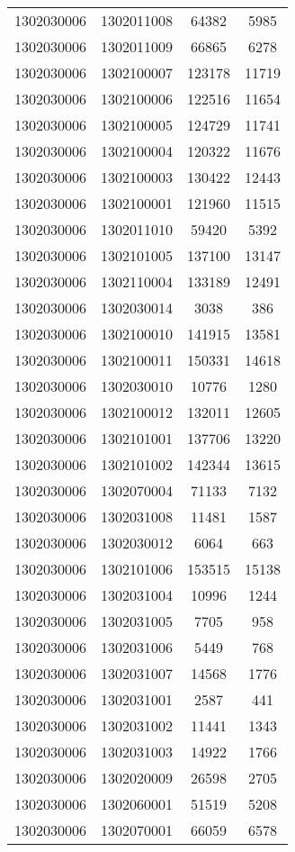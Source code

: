 \begin{longtable}[h]{llcc}
		1302030006 & 1302011008 & 64382 & 5985\\
		1302030006 & 1302011009 & 66865 & 6278\\
		1302030006 & 1302100007 & 123178 & 11719\\
		1302030006 & 1302100006 & 122516 & 11654\\
		1302030006 & 1302100005 & 124729 & 11741\\
		1302030006 & 1302100004 & 120322 & 11676\\
		1302030006 & 1302100003 & 130422 & 12443\\
		1302030006 & 1302100001 & 121960 & 11515\\
		1302030006 & 1302011010 & 59420 & 5392\\
		1302030006 & 1302101005 & 137100 & 13147\\
		1302030006 & 1302110004 & 133189 & 12491\\
		1302030006 & 1302030014 & 3038 & 386\\
		1302030006 & 1302100010 & 141915 & 13581\\
		1302030006 & 1302100011 & 150331 & 14618\\
		1302030006 & 1302030010 & 10776 & 1280\\
		1302030006 & 1302100012 & 132011 & 12605\\
		1302030006 & 1302101001 & 137706 & 13220\\
		1302030006 & 1302101002 & 142344 & 13615\\
		1302030006 & 1302070004 & 71133 & 7132\\
		1302030006 & 1302031008 & 11481 & 1587\\
		1302030006 & 1302030012 & 6064 & 663\\
		1302030006 & 1302101006 & 153515 & 15138\\
		1302030006 & 1302031004 & 10996 & 1244\\
		1302030006 & 1302031005 & 7705 & 958\\
		1302030006 & 1302031006 & 5449 & 768\\
		1302030006 & 1302031007 & 14568 & 1776\\
		1302030006 & 1302031001 & 2587 & 441\\
		1302030006 & 1302031002 & 11441 & 1343\\
		1302030006 & 1302031003 & 14922 & 1766\\
		1302030006 & 1302020009 & 26598 & 2705\\
		1302030006 & 1302060001 & 51519 & 5208\\
		1302030006 & 1302070001 & 66059 & 6578\\

\end{longtable}
